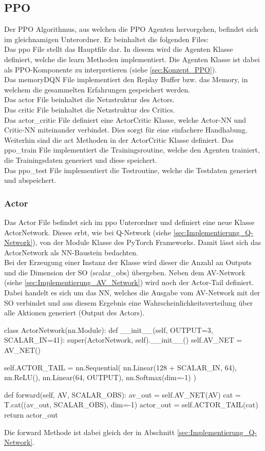 \subsection{PPO}
Der PPO Algorithmus, aus welchen die PPO Agenten hervorgehen, befindet sich im gleichnamigen Unterordner. Er beinhaltet die folgenden Files:\\
Das ppo File stellt das Hauptfile dar. In diesem wird die Agenten Klasse definiert, welche die learn Methoden implementiert. Die Agenten Klasse ist dabei als PPO-Komponente zu interpretieren (siehe \ref{sec:Konzept_PPO}).\\
Das memoryDQN File implementiert den Replay Buffer bzw. das Memory, in welchem die gesammelten Erfahrungen gespeichert werden.\\
Das actor File beinhaltet die Netzstruktur des Actors.\\
Das critic File beinhaltet die Netzstruktur des Critics.\\
Das actor\_critic File definiert eine ActorCritic Klasse, welche Actor-NN und Critic-NN miteinander verbindet. Dies sorgt für eine einfachere Handhabung. Weiterhin sind die act Methoden in der ActorCritic Klasse definiert.
Das ppo\_train File implementiert die Trainingsroutine, welche den Agenten trainiert, die Trainingsdaten generiert und diese speichert.\\
Das ppo\_test File implementiert die Testroutine, welche die Testdaten generiert und abspeichert.

\subsubsection{Actor}
Das Actor File befindet sich im ppo Unterordner und definiert eine neue Klasse ActorNetwork. Dieses erbt, wie bei Q-Network (siehe \ref{sec:Implementierung_Q-Network}), von der Module Klasse des PyTorch Frameworks. Damit lässt sich das ActorNetwork als NN-Baustein bedachten.\\
Bei der Erzeugung einer Instanz der Klasse wird dieser die Anzahl an Outputs und die Dimension der SO (scalar\_obs) übergeben.
Neben dem AV-Network (siehe \ref{sec:Implementierung_AV_Network}) wird noch der Actor-Tail definiert. Dabei handelt es sich um das NN, welches die Ausgabe vom AV-Network mit der SO verbindet und aus diesem Ergebnis eine Wahrscheinlichkeitsverteilung über alle Aktionen generiert (Output des Actors).
\begin{python}
	class ActorNetwork(nn.Module):
		def __init__(self, OUTPUT=3, SCALAR_IN=41):
		super(ActorNetwork, self).__init__()
		self.AV_NET = AV_NET()
		
		self.ACTOR_TAIL = nn.Sequential(
			nn.Linear(128 + SCALAR_IN, 64),
			nn.ReLU(),
			nn.Linear(64, OUTPUT),
			nn.Softmax(dim=-1)
		)
		
		def forward(self, AV, SCALAR_OBS):
			av_out = self.AV_NET(AV)
			cat = T.cat((av_out, SCALAR_OBS), dim=-1)
			actor_out = self.ACTOR_TAIL(cat)
			return actor_out
\end{python}
Die forward Methode ist dabei gleich der in Abschnitt \ref{sec:Implementierung_Q-Network}.

